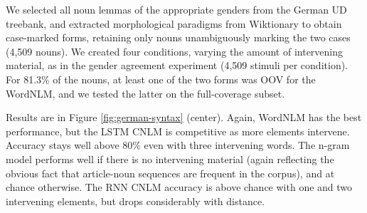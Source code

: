 We selected all noun lemmas of the appropriate genders from the German
UD treebank, and extracted morphological paradigms from Wiktionary to
obtain case-marked forms, retaining only nouns unambiguously marking
the two cases (4,509 nouns).  We created four conditions, varying the amount of
intervening material, as in the gender agreement experiment (4,509
stimuli per condition).  For 81.3\% of the nouns, at least one of the
two forms was OOV for the WordNLM, and we tested the latter on the
full-coverage subset.

Results are in Figure \ref{fig:german-syntax} (center).  Again,
WordNLM has the best performance, but the LSTM CNLM is competitive as
more elements intervene. Accuracy stays well above 80\% even with
three intervening words.  The n-gram model performs well if there is
no intervening material (again reflecting the obvious fact that
article-noun sequences are frequent in the corpus), and at chance
otherwise.  The RNN CNLM accuracy is above chance with one and two
intervening elements, but drops considerably with distance.

%
%

